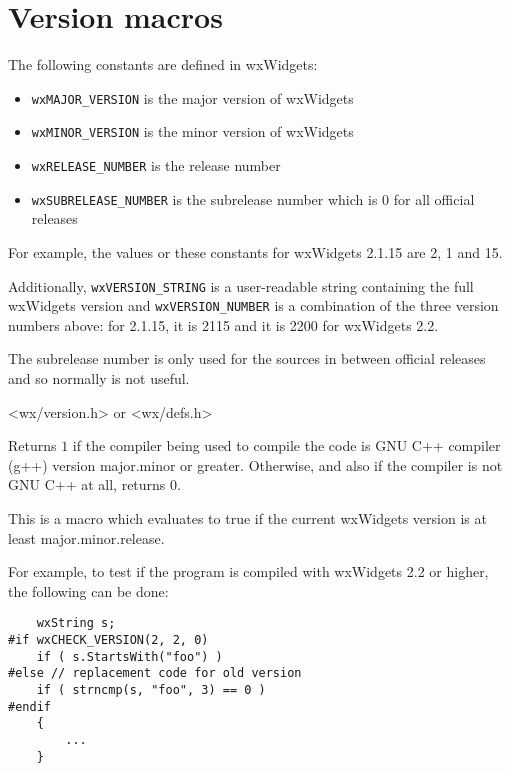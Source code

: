 \section{Version macros}\label{versionfunctions}

The following constants are defined in wxWidgets:

\begin{itemize}\itemsep=0pt
\item {\tt wxMAJOR\_VERSION} is the major version of wxWidgets
\item {\tt wxMINOR\_VERSION} is the minor version of wxWidgets
\item {\tt wxRELEASE\_NUMBER} is the release number
\item {\tt wxSUBRELEASE\_NUMBER} is the subrelease number which is $0$ for all
official releases
\end{itemize}

For example, the values or these constants for wxWidgets 2.1.15 are 2, 1 and
15.

Additionally, {\tt wxVERSION\_STRING} is a user-readable string containing
the full wxWidgets version and {\tt wxVERSION\_NUMBER} is a combination of the
three version numbers above: for 2.1.15, it is 2115 and it is 2200 for
wxWidgets 2.2.

The subrelease number is only used for the sources in between official releases
and so normally is not useful.


<wx/version.h> or <wx/defs.h>


\label{wxcheckgccversion}


Returns $1$ if the compiler being used to compile the code is GNU C++
compiler (g++) version major.minor or greater. Otherwise, and also if
the compiler is not GNU C++ at all, returns $0$.


\label{wxcheckversion}


This is a macro which evaluates to true if the current wxWidgets version is at
least major.minor.release.

For example, to test if the program is compiled with wxWidgets 2.2 or higher,
the following can be done:

\begin{verbatim}
    wxString s;
#if wxCHECK_VERSION(2, 2, 0)
    if ( s.StartsWith("foo") )
#else // replacement code for old version
    if ( strncmp(s, "foo", 3) == 0 )
#endif
    {
        ...
    }
\end{verbatim}


